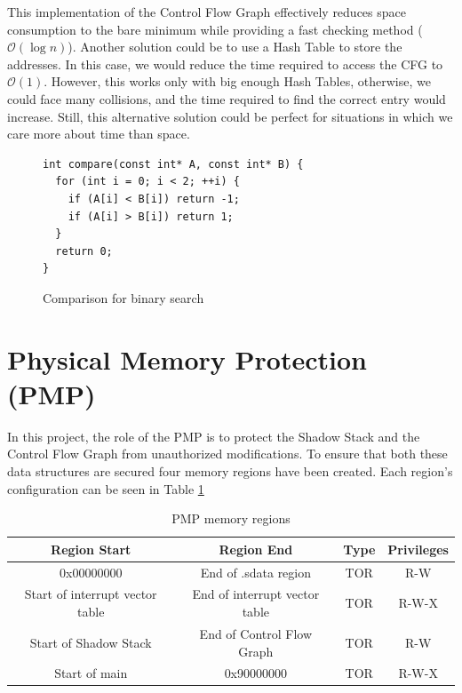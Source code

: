 This implementation of the Control Flow Graph effectively reduces space
consumption to the bare minimum while providing a fast checking method ($\mathcal{O}
(\log{n})$). Another solution could be to use a Hash Table to store the addresses.
In this case, we would reduce the time required to access the CFG to $\mathcal{O}
(1)$. However, this works only with big enough Hash Tables, otherwise, we could face
many collisions, and the time required to find the correct entry would increase.
Still, this alternative solution could be perfect for situations in which we
care more about time than space.

\begin{figure}[htbp]
  \centering
  \begin{lstlisting}[style=CStyle]
int compare(const int* A, const int* B) {
  for (int i = 0; i < 2; ++i) {
    if (A[i] < B[i]) return -1;
    if (A[i] > B[i]) return 1;
  }
  return 0;
}
 \end{lstlisting}
  \caption{Comparison for binary search}
  \label{fig:binsearch}
\end{figure}

\section{Physical Memory Protection (PMP)}
\label{sec:project_pmp}

In this project, the role of the PMP is to protect the Shadow Stack and the Control
Flow Graph from unauthorized modifications. To ensure that both these data
structures are secured four memory regions have been created. Each region's configuration
can be seen in Table \ref{tab:pmpregions}

\begin{table}
  \centering
  \begin{tabular}{|c|c|c|c|}
    \hline
    \textbf{Region Start}           & \textbf{Region End}           & \textbf{Type} & \textbf{Privileges} \\
    \hline
    0x00000000                      & End of .sdata region          & TOR           & R-W                 \\
    \hline
    Start of interrupt vector table & End of interrupt vector table & TOR           & R-W-X               \\
    \hline
    Start of Shadow Stack           & End of Control Flow Graph     & TOR           & R-W                 \\
    \hline
    Start of main                   & 0x90000000                    & TOR           & R-W-X               \\
    \hline
  \end{tabular}
  \caption{PMP memory regions}
  \label{tab:pmpregions}
\end{table}


